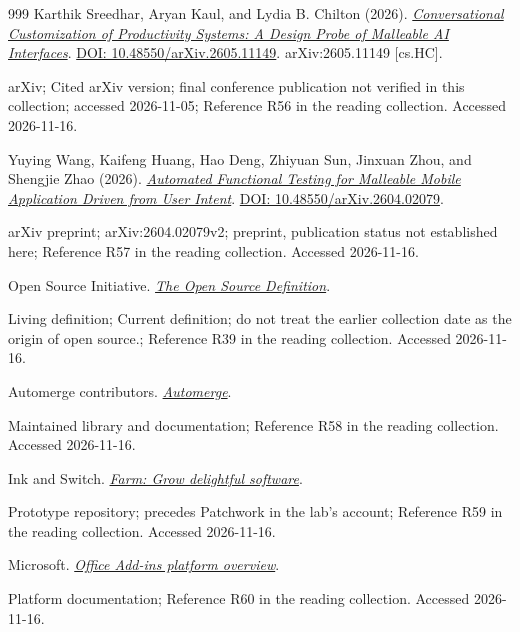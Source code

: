 \documentclass[11pt,letterpaper]{article}
\begin{document}
\begin{thebibliography}{999}
Karthik Sreedhar, Aryan Kaul, and Lydia B. Chilton (2026).
\href{https://arxiv.org/abs/2605.11149}{\emph{Conversational Customization of Productivity Systems: A Design Probe of Malleable AI Interfaces}}.
\href{https://doi.org/10.48550/arXiv.2605.11149}{DOI: 10.48550/arXiv.2605.11149}.
arXiv:2605.11149 [cs.HC].
\par {\small arXiv; Cited arXiv version; final conference publication not verified in this collection; accessed 2026-11-05; Reference R56 in the reading collection.}
{\small Accessed 2026-11-16.}

Yuying Wang, Kaifeng Huang, Hao Deng, Zhiyuan Sun, Jinxuan Zhou, and Shengjie Zhao (2026).
\href{https://arxiv.org/abs/2604.02079}{\emph{Automated Functional Testing for Malleable Mobile Application Driven from User Intent}}.
\href{https://doi.org/10.48550/arXiv.2604.02079}{DOI: 10.48550/arXiv.2604.02079}.
\par {\small arXiv preprint; arXiv:2604.02079v2; preprint, publication status not established here; Reference R57 in the reading collection.}
{\small Accessed 2026-11-16.}

Open Source Initiative.
\href{https://opensource.org/osd}{\emph{The Open Source Definition}}.
\par {\small Living definition; Current definition; do not treat the earlier collection date as the origin of open source.; Reference R39 in the reading collection.}
{\small Accessed 2026-11-16.}

Automerge contributors.
\href{https://automerge.org/}{\emph{Automerge}}.
\par {\small Maintained library and documentation; Reference R58 in the reading collection.}
{\small Accessed 2026-11-16.}

Ink and Switch.
\href{https://github.com/inkandswitch/farm}{\emph{Farm: Grow delightful software}}.
\par {\small Prototype repository; precedes Patchwork in the lab's account; Reference R59 in the reading collection.}
{\small Accessed 2026-11-16.}

Microsoft.
\href{https://learn.microsoft.com/en-us/office/dev/add-ins/overview/office-add-ins}{\emph{Office Add-ins platform overview}}.
\par {\small Platform documentation; Reference R60 in the reading collection.}
{\small Accessed 2026-11-16.}


\end{thebibliography}
\end{document}
